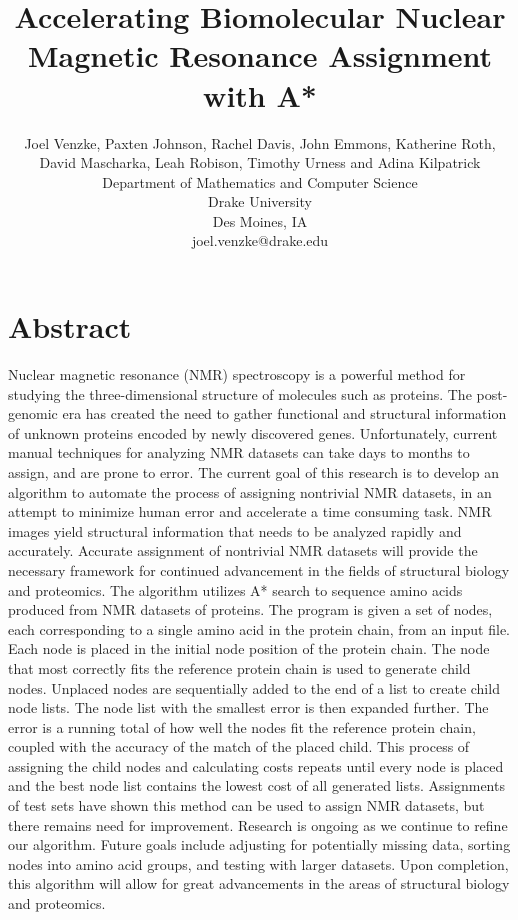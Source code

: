 \documentclass[12pt, letter]{article}
\begin{document}
\pagestyle{plain}

\title{Accelerating Biomolecular Nuclear Magnetic Resonance Assignment with A*}

\author{
Joel Venzke, Paxten Johnson, Rachel Davis, John Emmons, Katherine Roth,\\ David Mascharka, Leah Robison, Timothy Urness and Adina Kilpatrick\\
Department of Mathematics and Computer Science\\
Drake University\\
Des Moines, IA\\
joel.venzke@drake.edu
}
\date{} 

\maketitle
\thispagestyle{empty}

\section*{\centering Abstract}

Nuclear magnetic resonance (NMR) spectroscopy is a powerful method for studying the three-dimensional structure of molecules such as proteins. The post-genomic era has created the need to gather functional and structural information of unknown proteins encoded by newly discovered genes. Unfortunately, current manual techniques for analyzing NMR datasets can take days to months to assign, and are prone to error. The current goal of this research is to develop an algorithm to automate the process of assigning nontrivial NMR datasets, in an attempt to minimize human error and accelerate a time consuming task.
%
NMR images yield structural information that needs to be analyzed rapidly and accurately. Accurate assignment of nontrivial NMR datasets will provide the necessary framework for continued advancement in the fields of structural biology and proteomics. 
%
The algorithm utilizes A* search to sequence amino acids produced from NMR datasets of proteins. The program is given a set of nodes, each corresponding to a single amino acid in the protein chain, from an input file. Each node is placed in the initial node position of the protein chain. The node that most correctly fits the reference protein chain is used to generate child nodes. Unplaced nodes are sequentially added to the end of a list to create child node lists. The node list with the smallest error is then expanded further. The error is a running total of how well the nodes fit the reference protein chain, coupled with the accuracy of the match of the placed child. This process of assigning the child nodes and calculating costs repeats until every node is placed and the best node list contains the lowest cost of all generated lists. 
%
Assignments of test sets have shown this method can be used to assign NMR datasets, but there remains need for improvement. Research is ongoing as we continue to refine our algorithm. Future goals include adjusting for potentially missing data, sorting nodes into amino acid groups, and testing with larger datasets. Upon completion, this algorithm will allow for great advancements in the areas of structural biology and proteomics. 
\newpage
\setcounter{page}{1}
\end{document}
